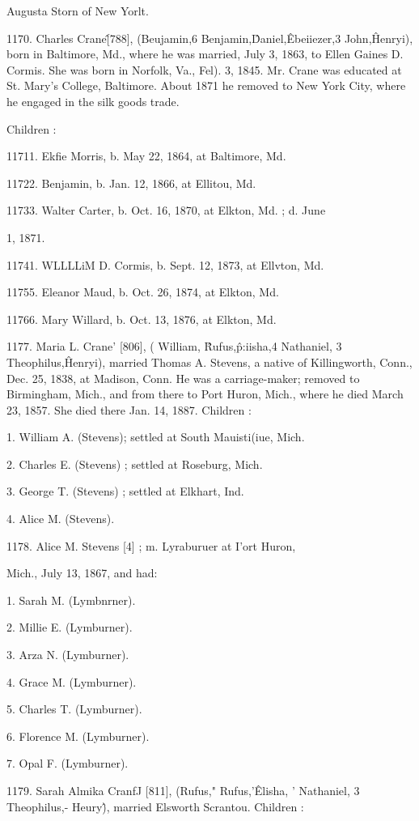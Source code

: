 Augusta Storn of New Yorlt. 

1170. Charles Crane\^ [788], (Beujamin,6 Benjamin,\^ Daniel,\^ 
Ebeiiezer,3 John,\^ Henryi), born in Baltimore, Md., where he 
was married, July 3, 1863, to Ellen Gaines D. Cormis. She was 
born in Norfolk, Va., Fel). 3, 1845. Mr. Crane was educated 
at St. Mary's College, Baltimore. About 1871 he removed to 
New York City, where he engaged in the silk goods trade. 

Children : 

11711. Ekfie Morris, b. May 22, 1864, at Baltimore, Md. 

11722. Benjamin, b. Jan. 12, 1866, at Ellitou, Md. 

11733. Walter Carter, b. Oct. 16, 1870, at Elkton, Md. ; d. June 

1, 1871. 

11741. WLLLLiM D. Cormis, b. Sept. 12, 1873, at Ellvton, Md. 

11755. Eleanor Maud, b. Oct. 26, 1874, at Elkton, Md. 

11766. Mary Willard, b. Oct. 13, 1876, at Elkton, Md. 

1177. Maria L. Crane' [806], ( William, \^ Rufus,\^ p:iisha,4 
Nathaniel, 3 Theophilus,\^ Henryi), married Thomas A. Stevens, 
a native of Killingworth, Conn., Dec. 25, 1838, at Madison, 
Conn. He was a carriage-maker; removed to Birmingham, 
Mich., and from there to Port Huron, Mich., where he died 
March 23, 1857. She died there Jan. 14, 1887. Children : 

1. William A. (Stevens); settled at South Mauisti(iue, Mich. 

2. Charles E. (Stevens) ; settled at Roseburg, Mich. 

3. George T. (Stevens) ; settled at Elkhart, Ind. 

4. Alice M. (Stevens). 

1178. Alice M. Stevens [4] ; m. Lyraburuer at I'ort Huron, 

Mich., July 13, 1867, and had: 

1. Sarah M. (Lymbnrner). 

2. Millie E. (Lymburner). 

3. Arza N. (Lymburner). 

4. Grace M. (Lymburner). 

5. Charles T. (Lymburner). 

6. Florence M. (Lymburner). 

7. Opal F. (Lymburner). 

1179. Sarah Almika CranfJ [811], (Rufus," Rufus,'\^ Elisha, ' 
Nathaniel, 3 Theophilus,- Heury\^), married Elsworth Scrantou. 
Children : 

